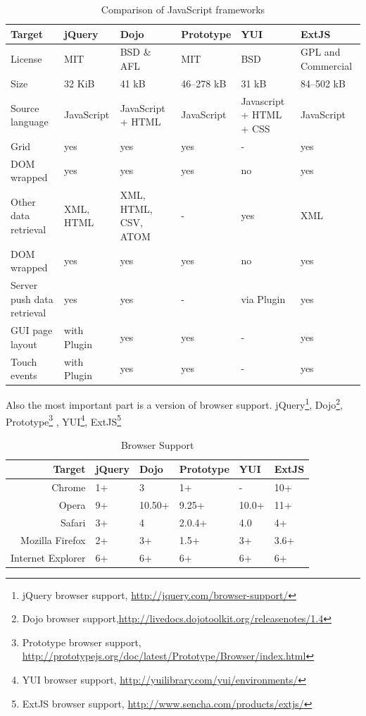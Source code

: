 	\begin{table}[H]
	\centering
	\begin{tabular}{|L{3cm}|l|L{2cm}|l|L{2cm}|L{2cm}|}
	\hline
	Target 			& jQuery & Dojo & Prototype & YUI & ExtJS \\
	\hline
	\hline
	License		& MIT & BSD \& AFL & MIT & BSD & GPL and Commercial \\
	\hline
	Size		& 32 KiB & 41 kB & 46–278 kB & 31 kB & 84–502 kB \\
	\hline
	Source language		& JavaScript & JavaScript + HTML & JavaScript &  Javascript + HTML + CSS & JavaScript \\
	\hline
	Grid		& yes & yes & yes & - & yes  \\
	\hline
	DOM wrapped		& yes & yes & yes & no & yes \\
	\hline
	Other data retrieval		& XML, HTML & XML, HTML, CSV, ATOM & - & yes & XML  \\
	\hline
	DOM wrapped		& yes & yes & yes & no & yes \\
	\hline
	Server push data retrieval		& yes & yes & - & via Plugin & yes \\
	\hline
	GUI page layout		& with Plugin & yes & yes & - & yes \\
	\hline 		
	Touch events		& with Plugin & yes & yes & - & yes \\
	\hline 
	\end{tabular}
	\caption[Caption in TOC]{Comparison of JavaScript frameworks}
	\label{tab:JS_frameworks}
	\end{table}
	Also the most important part is a version of browser support. jQuery\footnote{jQuery browser support, \url{http://jquery.com/browser-support/}}, Dojo\footnote{Dojo browser support,\url{http://livedocs.dojotoolkit.org/releasenotes/1.4}}, Prototype\footnote{Prototype browser support, \url{http://prototypejs.org/doc/latest/Prototype/Browser/index.html}} , YUI\footnote{YUI browser support, \url{http://yuilibrary.com/yui/environments/}}, ExtJS\footnote{ExtJS browser support, \url{http://www.sencha.com/products/extjs/}}

	\begin{table}[H]
	\centering
	\begin{tabular}{|r|l|l|l|l|l|}
	\hline
	Target 			& jQuery & Dojo & Prototype & YUI & ExtJS \\
	\hline
	\hline
	Chrome		& 1+ & 3 & 1+ & - & 10+ \\
	\hline
	Opera		& 9+ & 10.50+ & 9.25+ & 10.0+ & 11+ \\
	\hline
	Safari		& 3+ & 4 & 2.0.4+ & 4.0 & 4+ \\
	\hline
	Mozilla Firefox		& 2+ & 3+ & 1.5+ & 3+ & 3.6+ \\
	\hline
	Internet Explorer		& 6+ & 6+ & 6+ & 6+ & 6+ \\
	\hline
	\end{tabular}
	\caption[Caption in TOC]{Browser Support}
	\label{tab:internal_results}
	\end{table}


